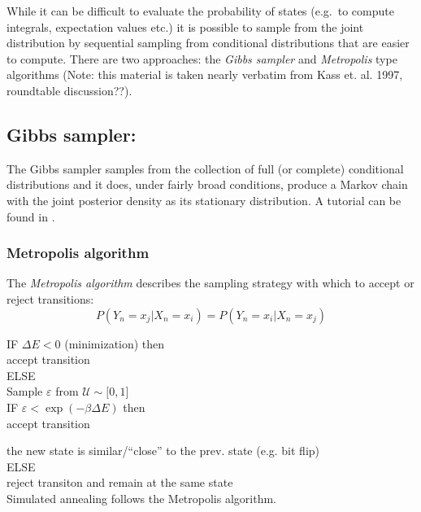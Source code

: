 While it can be difficult to evaluate the
probability of states (e.g.\ to compute integrals, expectation values
etc.) it is possible to sample from the joint distribution by
sequential sampling from conditional distributions that are easier to
compute. There are two approaches: the \emph{Gibbs sampler} and
\emph{Metropolis} type algorithms (Note: this material is taken nearly
verbatim from Kass et. al. 1997, roundtable discussion??).

\subsection{Gibbs sampler:}
\label{sec:gibbs-sampler}

The Gibbs sampler \citep{GemanGeman1984} samples from the collection
of full (or complete) conditional distributions and it does, under
fairly broad conditions, produce a Markov chain with the joint
posterior density as its stationary distribution.  A tutorial can be
found in \citep{CasellaGeorge1992}.

\newpage
\begin{frame}\frametitle{Metropolis algorithm}


The \emph{Metropolis algorithm} describes the sampling strategy with which to accept or reject transitions:
\begin{equation}
P(Y_n = x_j | X_{n} = x_i) = P(Y_n = x_i | X_{n} = x_j)
\end{equation}

IF $\Delta E < 0$ (minimization) then \\

\oident accept transition \\

ELSE \\

\oident Sample $\varepsilon$ from $\mathcal{U} \sim \lbrack 0, 1 \rbrack$ \\

IF $\varepsilon < \exp \left( - \beta \Delta E \right)$ then \\

\oident accept transition

\oident the new state is similar/``close'' to the prev. state (e.g. bit flip)\\


ELSE\\

\oident reject transiton and remain at the same state\\

\vspace{0.5cm}
Simulated annealing follows the Metropolis algorithm.

\end{frame}

